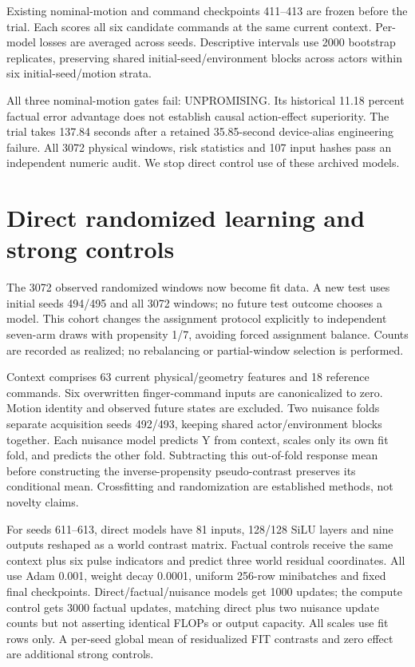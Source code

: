 \documentclass[10pt]{article}
\begin{document}
Existing nominal-motion and command checkpoints 411--413 are frozen before the
trial. Each scores all six candidate commands at the same current context.
Per-model losses are averaged across seeds. Descriptive intervals use 2000
bootstrap replicates, preserving shared initial-seed/environment blocks across
actors within six initial-seed/motion strata.

\begin{table}[h]
\centering

\caption{Randomized held-window conditional-effect risk differences, mm squared; negative favors the first predictor.}
\end{table}

All three nominal-motion gates fail: UNPROMISING. Its historical 11.18 percent
factual error advantage does not establish causal action-effect superiority.
The trial takes 137.84 seconds after a retained 35.85-second device-alias engineering
failure. All 3072 physical windows, risk statistics and 107 input hashes pass an
independent numeric audit. We stop direct control use of these archived models.

\section{Direct randomized learning and strong controls}
The 3072 observed randomized windows now become fit data. A new test uses initial
seeds 494/495 and all 3072 windows; no future test outcome chooses a model. This
cohort changes the assignment protocol explicitly to independent seven-arm draws
with propensity 1/7, avoiding forced assignment balance. Counts are recorded as
realized; no rebalancing or partial-window selection is performed.

Context comprises 63 current physical/geometry features and 18 reference commands.
Six overwritten finger-command inputs are canonicalized to zero. Motion identity
and observed future states are excluded. Two nuisance folds separate acquisition
seeds 492/493, keeping shared actor/environment blocks together. Each nuisance
model predicts Y from context, scales only its own fit fold, and predicts the
other fold. Subtracting this out-of-fold response mean before constructing the
inverse-propensity pseudo-contrast preserves its conditional mean. Crossfitting
and randomization are established methods, not novelty claims.

For seeds 611--613, direct models have 81 inputs, 128/128 SiLU layers and nine outputs
reshaped as a world contrast matrix. Factual controls receive the same context
plus six pulse indicators and predict three world residual coordinates. All use
Adam 0.001, weight decay 0.0001, uniform 256-row minibatches and fixed final checkpoints.
Direct/factual/nuisance models get 1000 updates; the compute control gets 3000
factual updates, matching direct plus two nuisance update counts but not asserting
identical FLOPs or output capacity. All scales use fit rows only. A per-seed global
mean of residualized FIT contrasts and zero effect are additional strong controls.
\end{document}
